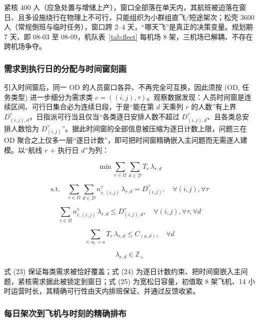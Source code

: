 \documentclass[UTF8,zihao=-4]{ctexart}
\numberwithin{figure}{section}
\numberwithin{table}{section}
\begin{document}
紧核 400 人（应急处置与增储上产），窗口全部落在单天内，其航班被迫落在窗日、且多设施绕行在物理上不可行，只能组织为小群组直飞/短途架次；松壳 3600 人（常规倒班与临时任务），窗口跨 2--4 天，“哪天飞”是真正的决策变量。规划期 7 天、即 08-03 至 08-09，机队表~\ref{tab:fleet} 每机场 8 架，三机场已解耦、不存在跨机场争夺。

\subsubsection{需求到执行日的分配与时间窗刻画}

引入时间窗后，同一 OD 的人员窗口各异、不再完全可互换，因此须按 (OD, 任务类型) 进一步细分为需求类 $c=((i,j),\tau)$。观察数据发现：人员时间窗是连续区间、可行日集合必为连续日段，于是“能在第 $d$ 天乘列 $r$ 的人数”有上界 $D_{(i,j),d}^{\tau}$，日指派可行当且仅当“各类逐日安排人数不超过 $D_{(i,j),d}^{\tau}$、且各类总安排人数恰为 $D_{(i,j)}^{\tau}$”。据此时间窗的全部信息被压缩为逐日计数上限，问题三在 OD 聚合之上仅多一层“逐日计数”，即可把时间窗精确嵌入主问题而无需逐人建模。以“航线 $r$ + 执行日 $d$”为列：

\begin{equation}
  \min \sum_{r\in\Omega}\sum_{d\in\mathcal{D}} T_r\,\lambda_{r,d}
\end{equation}

\begin{equation}
  \text{s.t.}\quad \sum_{r\in\Omega}\sum_{d\in\mathcal{D}} n_{r,(i,j)}^{\tau}\,\lambda_{r,d} = D_{(i,j)}^{\tau},\quad \forall(i,j),\forall\tau
\end{equation}

\begin{equation}
  \sum_{r\in\Omega} n_{r,(i,j)}^{\tau}\,\lambda_{r,d} \le D_{(i,j),d}^{\tau},\quad \forall(i,j),\forall\tau,\forall d
\end{equation}

\begin{equation}
  \sum_{r:\,a_r=a} T_r\,\lambda_{r,d} \le C_{(a,d)},\quad \forall d
\end{equation}

\begin{equation}
  \lambda_{r,d}\in\mathbb{Z}_+
\end{equation}

式 (23) 保证每类需求被恰好覆盖；式 (24) 为逐日计数约束、把时间窗嵌入主问题，紧核需求据此被锁定到窗日；式 (25) 为宽松日容量，初值取 8 架飞机、14 小时运营时长，其精确可行性由天内排班保证、并通过反馈收紧。

\subsubsection{每日架次到飞机与时刻的精确排布}
\end{document}
